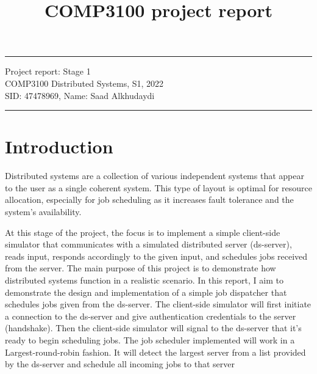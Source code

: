 \documentclass[a4paper]{article} %
\begin{document}

\title{COMP3100 project report} %
\fancyhead[C]{}
\hrule \medskip %
\begin{minipage}{1\textwidth} %
\centering 
\large %
Project report: Stage 1\\ %
COMP3100 Distributed Systems, S1, 2022\\
\normalsize %
SID: 47478969, Name: Saad Alkhudaydi
\end{minipage}
\medskip\hrule %
\bigskip

\tableofcontents


\section{Introduction}
Distributed systems are a collection of various independent systems that appear to the user as a single coherent system. This type of layout is optimal for resource allocation, especially for job scheduling as it increases fault tolerance and the system's availability.\cite{van2016brief}





At this stage of the project, the focus is to implement a simple client-side simulator that communicates with a simulated distributed server (ds-server), reads input, responds accordingly to the given input, and schedules jobs received from the server. The main purpose of this project is to demonstrate how distributed systems function in a realistic scenario. In this report, I aim to demonstrate the design and implementation of a simple job dispatcher that schedules jobs given from the ds-server. The client-side simulator will first initiate a connection to the ds-server and give authentication credentials to the server (handshake). Then the client-side simulator will signal to the ds-server that it's ready to begin scheduling jobs. The job scheduler implemented will work in a Largest-round-robin fashion. It will detect the largest server from a list provided by the ds-server and schedule all incoming jobs to that server
\end{document}
